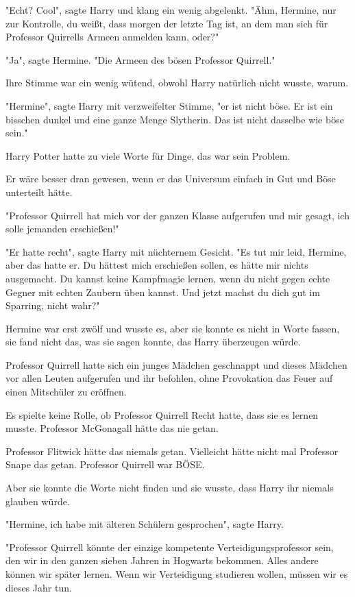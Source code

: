 {"Echt? Cool", sagte Harry und klang ein wenig abgelenkt. "Ähm, Hermine, nur zur Kontrolle, du weißt, dass morgen der letzte Tag ist, an dem man sich für Professor Quirrells Armeen anmelden kann, oder?"

"Ja", sagte Hermine. "Die Armeen des bösen Professor Quirrell."

Ihre Stimme war ein wenig wütend, obwohl Harry natürlich nicht wusste, warum.

"Hermine", sagte Harry mit verzweifelter Stimme, "er ist nicht böse. Er ist ein bisschen dunkel und eine ganze Menge Slytherin. Das ist nicht dasselbe wie böse sein."

Harry Potter hatte zu viele Worte für Dinge, das war sein Problem.

Er wäre besser dran gewesen, wenn er das Universum einfach in Gut und Böse unterteilt hätte.

"Professor Quirrell hat mich vor der ganzen Klasse aufgerufen und mir gesagt, ich solle jemanden erschießen!"

"Er hatte recht", sagte Harry mit nüchternem Gesicht. "Es tut mir leid, Hermine, aber das hatte er. Du hättest mich erschießen sollen, es hätte mir nichts ausgemacht. Du kannst keine Kampfmagie lernen, wenn du nicht gegen echte Gegner mit echten Zaubern üben kannst. Und jetzt machst du dich gut im Sparring, nicht wahr?"

Hermine war erst zwölf und wusste es, aber sie konnte es nicht in Worte fassen, sie fand nicht das, was sie sagen konnte, das Harry überzeugen würde.

Professor Quirrell hatte sich ein junges Mädchen geschnappt und dieses Mädchen vor allen Leuten aufgerufen und ihr befohlen, ohne Provokation das Feuer auf einen Mitschüler zu eröffnen.

Es spielte keine Rolle, ob Professor Quirrell Recht hatte, dass sie es lernen musste. Professor McGonagall hätte das nie getan.

Professor Flitwick hätte das niemals getan. Vielleicht hätte nicht mal Professor Snape das getan. Professor Quirrell war BÖSE.

Aber sie konnte die Worte nicht finden und sie wusste, dass Harry ihr niemals glauben würde.

"Hermine, ich habe mit älteren Schülern gesprochen", sagte Harry.

"Professor Quirrell könnte der einzige kompetente Verteidigungsprofessor sein, den wir in den ganzen sieben Jahren in Hogwarts bekommen. Alles andere können wir später lernen. Wenn wir Verteidigung studieren wollen, müssen wir es dieses Jahr tun.

}
